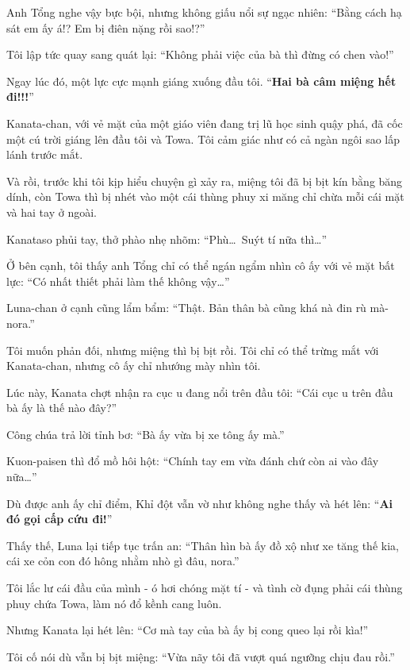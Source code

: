 \documentclass[../main.tex]{subfiles}
\begin{document}
Anh Tổng nghe vậy bực bội, nhưng không giấu nổi sự ngạc nhiên: ``Bằng cách hạ sát em ấy á!? Em bị điên nặng rồi sao!?''

Tôi lập tức quay sang quát lại: ``Không phải việc của bà thì đừng có chen vào!''

Ngay lúc đó, một lực cực mạnh giáng xuống đầu tôi. ``\textbf{Hai bà câm miệng hết đi!!!}''

Kanata-chan, với vẻ mặt của một giáo viên đang trị lũ học sinh quậy phá, đã cốc một cú trời giáng lên đầu tôi và Towa. Tôi cảm giác như có cả ngàn ngôi sao lấp lánh trước mắt.

Và rồi, trước khi tôi kịp hiểu chuyện gì xảy ra, miệng tôi đã bị bịt kín bằng băng dính, còn Towa thì bị nhét vào một cái thùng phuy xi măng chỉ chừa mỗi cái mặt và hai tay ở ngoài.


Kanataso phủi tay, thở phào nhẹ nhõm: ``Phù\dots\ Suýt tí nữa thì\dots''

Ở bên cạnh, tôi thấy anh Tổng chỉ có thể ngán ngẩm nhìn cô ấy với vẻ mặt bất lực: ``Có nhất thiết phải làm thế không vậy\dots''

Luna-chan ở cạnh cũng lẩm bẩm: ``Thật. Bản thân bà cũng khá nà đin rù mà-nora.''

Tôi muốn phản đối, nhưng miệng thì bị bịt rồi. Tôi chỉ có thể trừng mắt với Kanata-chan, nhưng cô ấy chỉ nhướng mày nhìn tôi.

Lúc này, Kanata chợt nhận ra cục u đang nổi trên đầu tôi: ``Cái cục u trên đầu bà ấy là thế nào đây?''

Công chúa trả lời tỉnh bơ: ``Bà ấy vừa bị xe tông ấy mà.''

Kuon-paisen thì đổ mồ hôi hột: ``Chính tay em vừa đánh chứ còn ai vào đây nữa\dots''

Dù được anh ấy chỉ điểm, Khỉ đột vẫn vờ như không nghe thấy và hét lên: ``\textbf{Ai đó gọi cấp cứu đi!}''

Thấy thế, Luna lại tiếp tục trấn an: ``Thân hìn bà ấy đồ xộ như xe tăng thế kia, cái xe cỏn con đó hông nhằm nhò gì đâu, nora.''

Tôi lắc lư cái đầu của mình - ó hơi chóng mặt tí - và tình cờ đụng phải cái thùng phuy chứa Towa, làm nó đổ kềnh cang luôn.

Nhưng Kanata lại hét lên: ``Cơ mà tay của bà ấy bị cong queo lại rồi kìa!''


Tôi cố nói dù vẫn bị bịt miệng: ``Vừa nãy tôi đã vượt quá ngưỡng chịu đau rồi.''
\end{document}
